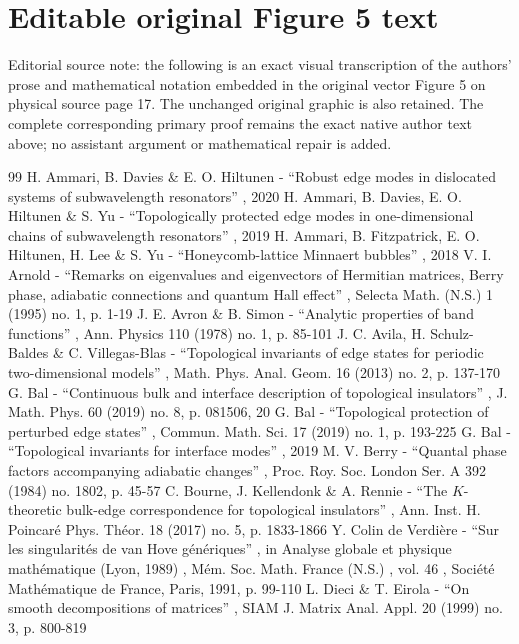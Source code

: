 \documentclass[11pt]{article}
\numberwithin{equation}{section}
\begin{document}
\section*{Editable original Figure 5 text}
\noindent Editorial source note: the following is an exact visual transcription of the authors' prose and mathematical notation embedded in the original vector Figure 5 on physical source page 17. The unchanged original graphic is also retained. The complete corresponding primary proof remains the exact native author text above; no assistant argument or mathematical repair is added.

\begin{thebibliography}{99}
 H. Ammari, B. Davies \& E. O. Hiltunen - “Robust edge modes in dislocated systems of subwavelength resonators” , 2020
 H. Ammari, B. Davies, E. O. Hiltunen \& S. Yu - “Topologically protected edge modes in one-dimensional chains of subwavelength resonators” , 2019
 H. Ammari, B. Fitzpatrick, E. O. Hiltunen, H. Lee \& S. Yu - “Honeycomb-lattice Minnaert bubbles” , 2018
 V. I. Arnold - “Remarks on eigenvalues and eigenvectors of Hermitian matrices, Berry phase, adiabatic connections and quantum Hall effect” , Selecta Math. (N.S.) 1 (1995) no. 1, p. 1-19
 J. E. Avron \& B. Simon - “Analytic properties of band functions” , Ann. Physics 110 (1978) no. 1, p. 85-101
 J. C. Avila, H. Schulz-Baldes \& C. Villegas-Blas - “Topological invariants of edge states for periodic two-dimensional models” , Math. Phys. Anal. Geom. 16 (2013) no. 2, p. 137-170
 G. Bal - “Continuous bulk and interface description of topological insulators” , J. Math. Phys. 60 (2019) no. 8, p. 081506, 20
 G. Bal - “Topological protection of perturbed edge states” , Commun. Math. Sci. 17 (2019) no. 1, p. 193-225
 G. Bal - “Topological invariants for interface modes” , 2019
 M. V. Berry - “Quantal phase factors accompanying adiabatic changes” , Proc. Roy. Soc. London Ser. A 392 (1984) no. 1802, p. 45-57
 C. Bourne, J. Kellendonk \& A. Rennie - “The $K$-theoretic bulk-edge correspondence for topological insulators” , Ann. Inst. H. Poincaré Phys. Théor. 18 (2017) no. 5, p. 1833-1866
 Y. Colin de Verdière - “Sur les singularités de van Hove génériques” , in Analyse globale et physique mathématique (Lyon, 1989) , Mém. Soc. Math. France (N.S.) , vol. 46 , Société Mathématique de France, Paris, 1991, p. 99-110
 L. Dieci \& T. Eirola - “On smooth decompositions of matrices” , SIAM J. Matrix Anal. Appl. 20 (1999) no. 3, p. 800-819

\end{thebibliography}
\end{document}

